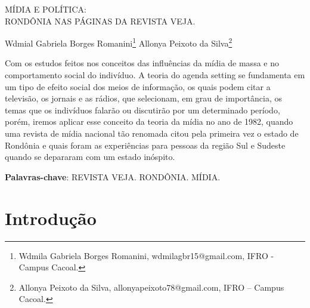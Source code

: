\documentclass[article,12pt,onesidea,4paper,english,brazil]{abntex2}
\begin{document}
	
	
	\frenchspacing 
	
	\begin{center}
		\LARGE MÍDIA E POLÍTICA: \\RONDÔNIA NAS PÁGINAS DA REVISTA VEJA.
		
		\normalsize
	Wdmial Gabriela Borges Romanini\footnote{Wdmila Gabriela Borges Romanini, wdmilagbr15@gmail.com, IFRO - Campus Cacoal.} 
	Allonya Peixoto da Silva\footnote{Allonya Peixoto da Silva, allonyapeixoto78@gmail.com, IFRO – Campus Cacoal.} 
		
	\end{center}
	
	\begin{resumoumacoluna}
		Com os estudos feitos nos conceitos das influências da mídia de massa e no comportamento social do indivíduo. A teoria do agenda setting se fundamenta  em um tipo de efeito social dos meios de informação, os quais podem citar a televisão, os jornais e as rádios, que selecionam, em grau de importância, os temas que os indivíduos falarão ou discutirão por um determinado período, porém, iremos aplicar esse conceito da teoria da mídia no ano de 1982, quando uma revista de mídia nacional tão renomada citou pela primeira vez o estado de Rondônia e quais foram as experiências para pessoas da região Sul e Sudeste quando se depararam com um estado inóspito.
		
		\vspace{\onelineskip}
		
		\noindent
		\textbf{Palavras-chave}: REVISTA VEJA. RONDÔNIA. MÍDIA.
	\end{resumoumacoluna}
	
	\section*{Introdução}
	
\end{document}
